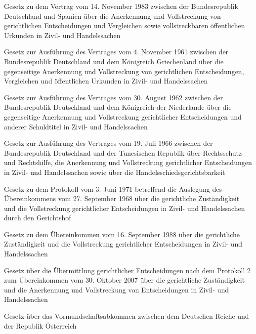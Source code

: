 \item[{VollstrVtrESPG}] Gesetz zu dem Vertrag vom 14. November 1983 zwischen der Bundesrepublik Deutschland und Spanien über die Anerkennung und Vollstreckung von gerichtlichen Entscheidungen und Vergleichen sowie vollstreckbaren öffentlichen Urkunden in Zivil- und Handelssachen

\item[{VollstrVtrGRCAG}] Gesetz zur Ausführung des Vertrages vom 4. November 1961 zwischen der Bundesrepublik Deutschland und dem Königreich Griechenland über die gegenseitige Anerkennung und Vollstreckung von gerichtlichen Entscheidungen, Vergleichen und öffentlichen Urkunden in Zivil- und Handelssachen

\item[{VollstrVtrNLDAG}] Gesetz zur Ausführung des Vertrages vom 30. August 1962 zwischen der Bundesrepublik Deutschland und dem Königreich der Niederlande über die gegenseitige Anerkennung und Vollstreckung gerichtlicher Entscheidungen und anderer Schuldtitel in Zivil- und Handelssachen

\item[{VollstrVtrTUNAG}] Gesetz zur Ausführung des Vertrages vom 19. Juli 1966 zwischen der Bundesrepublik Deutschland und der Tunesischen Republik über Rechtsschutz und Rechtshilfe, die Anerkennung und Vollstreckung gerichtlicher Entscheidungen in Zivil- und Handelssachen sowie über die Handelsschiedsgerichtsbarkeit

\item[{VollstrZustProtG}] Gesetz zu dem Protokoll vom 3. Juni 1971 betreffend die Auslegung des Übereinkommens vom 27. September 1968 über die gerichtliche Zuständigkeit und die Vollstreckung gerichtlicher Entscheidungen in Zivil- und Handelssachen durch den Gerichtshof

\item[{VollstrZustÜbk1988G}] Gesetz zu dem Übereinkommen vom 16. September 1988 über die gerichtliche Zuständigkeit und die Vollstreckung gerichtlicher Entscheidungen in Zivil- und Handelssachen

\item[{VollstrZustÜbk2007Prot2ÜG}] Gesetz über die Übermittlung gerichtlicher Entscheidungen nach dem Protokoll 2 zum Übereinkommen vom 30. Oktober 2007 über die gerichtliche Zuständigkeit und die Anerkennung und Vollstreckung von Entscheidungen in Zivil- und Handelssachen

\item[{VormAbkAUTG}] Gesetz über das Vormundschaftsabkommen zwischen dem Deutschen Reiche und der Republik Österreich

